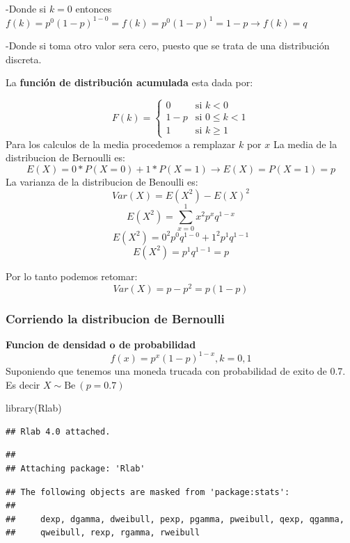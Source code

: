 \documentclass[
]{article}
\newenvironment{Shaded}{\begin{snugshade}}{\end{snugshade}}
\newcommand{\FunctionTok}[1]{\textcolor[rgb]{0.00,0.00,0.00}{#1}}
\newcommand{\NormalTok}[1]{#1}
\begin{document}
-Donde si \(k=0\) entonces
\(f(k)=p^0(1-p)^{1-0}=f(k)=p^0(1-p)^{1}=1-p\longrightarrow f(k)=q\)

-Donde si toma otro valor sera cero, puesto que se trata de una
distribución discreta.

La \textbf{función de distribución acumulada} esta dada por:

\[F(k) = \left\{
\begin{array}{rl}
     0 & \text{si } k<0 
  \\ 1-p & \text{si } 0\le k<1
  \\ 1 & \text{si } k\ge 1
\end{array}
\right.\] Para los calculos de la media procedemos a remplazar \(k\) por
\(x\) La media de la distribucion de Bernoulli es:
\[E(X)=0*P(X=0)+1*P(X=1) \longrightarrow E(X)=P(X=1)=p\] La varianza de
la distribucion de Benoulli es: \[Var(X)=E(X^2)-E(X)^2\]
\[E(X^2)=\sum_{x=0}^1 x^2p^xq^{1-x}\]
\[E(X^2)=0^2p^0q^{1-0}+1^2p^1q^{1-1}\] \[E(X^2)=p^1q^{1-1}=p\]

Por lo tanto podemos retomar: \[Var(X)=p-p^2=p(1-p)\]

\hypertarget{corriendo-la-distribucion-de-bernoulli}{%
\subsubsection{Corriendo la distribucion de
Bernoulli}\label{corriendo-la-distribucion-de-bernoulli}}

\textbf{Funcion de densidad o de probabilidad}
\[f(x)=p^x(1-p)^{1-x}, k={0,1}\] Suponiendo que tenemos una moneda
trucada con probabilidad de exito de 0.7. Es decir
\(X\sim \text{Be}\ (p=0.7)\)

\begin{Shaded}
\begin{Highlighting}[]
\FunctionTok{library}\NormalTok{(Rlab)}
\end{Highlighting}
\end{Shaded}

\begin{verbatim}
## Rlab 4.0 attached.
\end{verbatim}

\begin{verbatim}
## 
## Attaching package: 'Rlab'
\end{verbatim}

\begin{verbatim}
## The following objects are masked from 'package:stats':
## 
##     dexp, dgamma, dweibull, pexp, pgamma, pweibull, qexp, qgamma,
##     qweibull, rexp, rgamma, rweibull
\end{verbatim}
\end{document}
